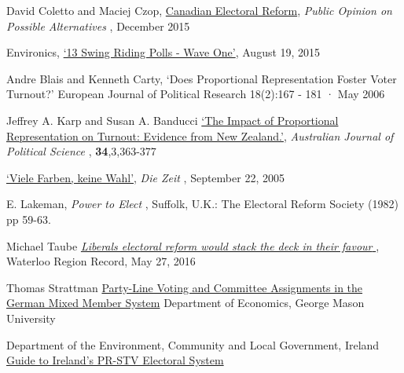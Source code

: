 \documentclass[DIV=calc, paper=a4, fontsize=11pt, twocolumn]{scrartcl}	 %
\begin{document}
\begin{thebibliography}{99} %

David Coletto and Maciej Czop,
{\color{blue} \href{https://d3n8a8pro7vhmx.cloudfront.net/broadbent/pages/4770/attachments/original/1448994262/Canadian_Electoral_Reform_-_Report.pdf?1448994262}{Canadian Electoral Reform}},
{\emph{Public Opinion on Possible Alternatives} }, December 2015

Environics,
{\color{blue} \href{http://www.votetogether.ca/pages/localpolling/}{`13 Swing Riding Polls - Wave One'}}, August 19, 2015

Andre Blais and Kenneth Carty, 
`Does Proportional Representation Foster Voter Turnout?'
European Journal of Political Research 18(2):167 - 181 · May 2006

Jeffrey A. Karp and Susan A. Banducci
{\color{blue} \href{http://www.jkarp.com/pdf/ajps_1999.pdf}{`The Impact of Proportional Representation on Turnout: Evidence from New Zealand.'}},
{ \emph{Australian Journal of Political Science} }, \textbf{34},3,363-377

  
{\color{blue} \href{http://www.zeit.de/2005/39/Wahl\_paradox}{`Viele Farben, keine Wahl'}},
 { \emph{Die Zeit} }, September 22, 2005

E. Lakeman,
{ \emph{Power to Elect} }, Suffolk, U.K.: The Electoral Reform Society (1982) pp 59-63.

 Michael Taube
{\color{blue} \href{http://www.therecord.com/opinion-story/6692466-liberals-electoral-reform-would-stack-the-deck-in-their-favour/}{ \emph{Liberals electoral reform would stack the deck in their favour} } },
Waterloo Region Record, May 27, 2016 

Thomas Strattman
{\color{blue} \href{https://www.researchgate.net/profile/Thomas_Stratmann2/publication/228978716_Party-Line_Voting_and_Committee_Assignments_in_the_German_Mixed_Member_System/links/0c96052d411ad2b0ae000000/Party-Line-Voting-and-Committee-Assignments-in-the-German-Mixed-Member-System.pdf}{Party-Line Voting and Committee Assignments in the German Mixed Member System}}
Department of Economics, George Mason University

Department of the Environment, Community and Local Government, Ireland
{\color{blue} \href{https://www.laois.ie/wp-content/uploads/Guide-to-Irelands-Electoral-System-2.pdf}{Guide to Ireland’s PR-STV Electoral System}}
 
\end{thebibliography}
\end{document}
